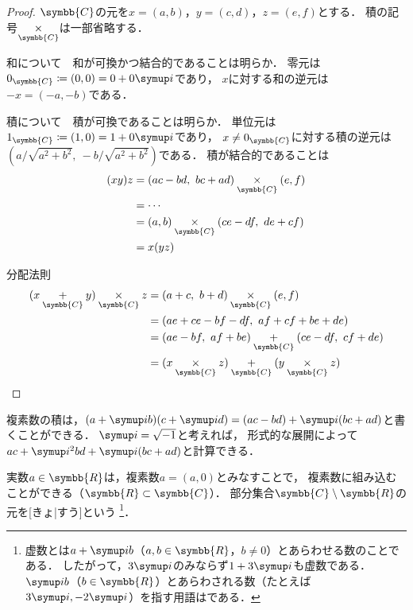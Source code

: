 \documentclass[../sotsu.tex]{subfiles}
\begin{document}
\begin{proof}
    $\symbb{C}$の元を$x = (a, b)$，$y = (c, d)$，$z = (e, f)$とする．
    積の記号$\underset{\symbb{C}}{\times}$は一部省略する．

    \textsf{和について}　和が可換かつ結合的であることは明らか．
    零元は$0_{\symbb{C}} \coloneq (0, 0) = 0 + 0\iu$であり，
    $x$に対する和の逆元は$-x = (-a, -b)$である．

    \textsf{積について}　積が可換であることは明らか．
    単位元は$1_{\symbb{C}} \coloneq (1, 0) = 1 + 0\iu$であり，
    $x \neq 0_{\symbb{C}}$に対する積の逆元は$(a / \sqrt{a^2 + b^2}, \  -b / \sqrt{a^2 + b^2} )$である．
    積が結合的であることは
    \begin{equation*}
        \begin{split}
            (xy)z &= (ac-bd, \  bc+ad) \underset{\symbb{C}}{\times} (e, f)   \\
                  &= \cdots  \\
                  &= (a, b) \underset{\symbb{C}}{\times} (ce-df, \  de+cf)   \\
                  &= x(yz)
        \end{split}
    \end{equation*}

    \textsf{分配法則}　
    \begin{equation*}
        \begin{split}
            (x \underset{\symbb{C}}{+} y) \underset{\symbb{C}}{\times} z
            &= (a+c, \  b+d) \underset{\symbb{C}}{\times} (e, f)   \\ 
            &= (ae+ce-bf-df, \  af+cf+be+de)   \\
            &= (ae-bf, \  af+be) \underset{\symbb{C}}{+} (ce-df, \  cf+de)   \\
            &= (x \underset{\symbb{C}}{\times} z) \underset{\symbb{C}}{+}
               (y \underset{\symbb{C}}{\times} z)
        \end{split}
    \end{equation*}
\end{proof}

複素数の積は，$(a + \iu b) (c + \iu d) = (ac - bd) + \iu (bc + ad)$と書くことができる．
$\iu = \sqrt{-1}$と考えれば，
形式的な展開によって$ac + \iu^2 bd + \iu (bc + ad)$と計算できる．

実数$a \in \symbb{R}$は，複素数$a = (a, 0)$とみなすことで，
複素数に組み込むことができる（$\symbb{R} \subset \symbb{C}$）．
部分集合$\symbb{C} \setminus \symbb{R}$の元を[きょ|すう]という%
\footnote{
    虚数とは$a + \iu b$（$a, b \in \symbb{R}$，$b \neq 0$）とあらわせる数のことである．
    したがって，$3\iu$のみならず$1 + 3\iu$も虚数である．
    $\iu b$（$b \in \symbb{R}$）とあらわされる数（たとえば$3\iu, -2\iu$）を指す用語はである．
}．
\end{document}
